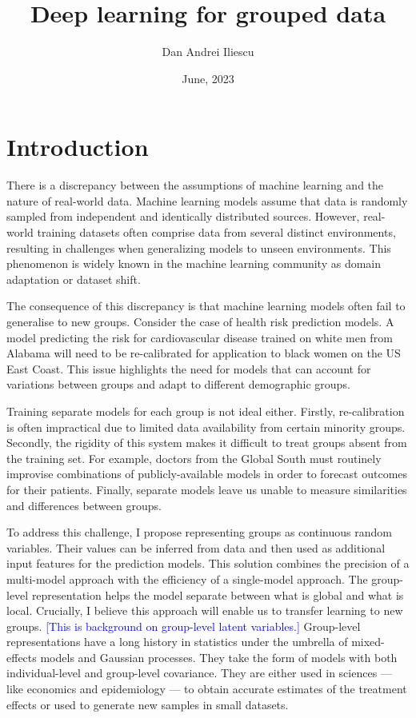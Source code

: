 \documentclass[backrefs]{cam-thesis}
\title{\bf Deep learning for grouped data}
\author{Dan Andrei Iliescu}
\date{June, 2023}
\newcommand{\draft}[1]{\textcolor{blue}{#1}}
\begin{document}
\allsectionsfont{\sffamily}

\frontmatter{}



\chapter{Introduction}

There is a discrepancy between the assumptions of machine learning and the nature of real-world data. Machine learning models assume that data is randomly sampled from independent and identically distributed sources. However, real-world training datasets often comprise data from several distinct environments, resulting in challenges when generalizing models to unseen environments. This phenomenon is widely known in the machine learning community as domain adaptation or dataset shift.

The consequence of this discrepancy is that machine learning models often fail to generalise to new groups. Consider the case of health risk prediction models. A model predicting the risk for cardiovascular disease trained on white men from Alabama will need to be re-calibrated for application to black women on the US East Coast. This issue highlights the need for models that can account for variations between groups and adapt to different demographic groups.

Training separate models for each group is not ideal either. Firstly, re-calibration is often impractical due to limited data availability from certain minority groups. Secondly, the rigidity of this system makes it difficult to treat groups absent from the training set. For example, doctors from the Global South must routinely improvise combinations of publicly-available models in order to forecast outcomes for their patients. Finally, separate models leave us unable to measure similarities and differences between groups.

To address this challenge, I propose representing groups as continuous random variables. Their values can be inferred from data and then used as additional input features for the prediction models. This solution combines the precision of a multi-model approach with the efficiency of a single-model approach. The group-level representation helps the model separate between what is global and what is local. Crucially, I believe this approach will enable us to transfer learning to new groups.
\draft{[This is background on group-level latent variables.]} Group-level representations have a long history in statistics under the umbrella of mixed-effects models and Gaussian processes. They take the form of models with both individual-level and group-level covariance. They are either used in sciences --- like economics and epidemiology --- to obtain accurate estimates of the treatment effects or used to generate new samples in small datasets.
\end{document}
